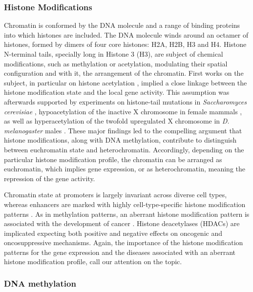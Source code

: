 \subsubsection{Histone Modifications}

Chromatin is conformed by the DNA molecule and a range of binding proteins into which histones are included. The DNA molecule winds around an octamer of histones, formed by dimers of four core histones: H2A, H2B, H3 and H4. Histone N-terminal tails, specially long in Histone 3 (H3), are subject of chemical modifications, such as methylation or acetylation, modulating their spatial configuration and with it, the arrangement of the chromatin. First works on the subject, in particular on histone acetylation \cite{Schatz1964}, implied a close linkage between the histone modification state and the local gene activity. This assumption was afterwards supported by experiments on histone-tail mutations in \textit{Saccharomyces cerevisiae} \cite{Kayne1988}, hypoacetylation of the inactive X chromosome in female mammals \cite{Jeppesen1993}, as well as hyperacetylation of the twofold upregulated X chromosome in \textit{D. melanogaster} males \cite{Bone1994}. These major findings led to the compelling argument that histone modifications, along with DNA methylation, contribute to distinguish between euchromatin state and heterochromatin. Accordingly, depending on the particular histone modification profile, the chromatin can be arranged as euchromatin, which implies gene expression, or as heterochromatin, meaning the repression of the gene activity.

\medskip

Chromatin state at promoters is largely invariant across diverse cell types, whereas enhancers are marked with highly cell-type-specific histone modification patterns \cite{Heintzman2009}. As in methylation patterns, an aberrant histone modification pattern is associated with the development of cancer \cite{Barneda-Zahonero2012}. Histone deacetylases (HDACs) are implicated expecting both positive and negative effects on oncogenic and oncosuppressive mechanisms. Again, the importance of the histone modification patterns for the gene expression and the diseases associated with an aberrant histone modification profile, call our attention on the topic.

\subsubsection{DNA methylation}

